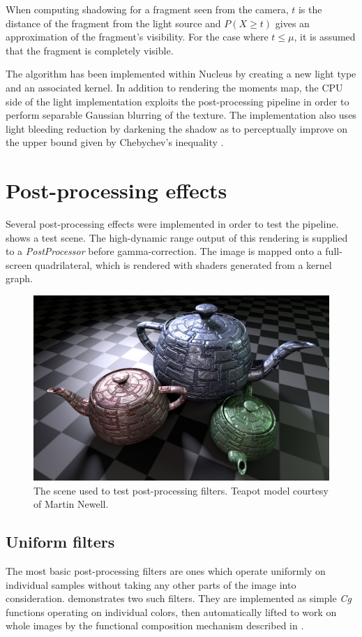 When computing shadowing for a fragment seen from the camera, $t$ is the distance of the fragment from the light source and $P(X \geq t)$ gives an approximation of the fragment's visibility. For the case where $t \leq \mu$, it is assumed that the fragment is completely visible.

The algorithm has been implemented within Nucleus by creating a new light type and an associated kernel. In addition to rendering the moments map, the CPU side of the light implementation exploits the post-processing pipeline in order to perform separable Gaussian blurring of the texture. The implementation also uses light bleeding reduction by darkening the shadow as to perceptually improve on the upper bound given by Chebychev's inequality \cite{SATVSM}.

\clearpage
\section{Post-processing effects}

Several post-processing effects were implemented in order to test the pipeline.  shows a test scene. The high-dynamic range output of this rendering is supplied to a \emph{PostProcessor} before gamma-correction. The image is mapped onto a full-screen quadrilateral, which is rendered with shaders generated from a kernel graph.

\begin{figure}[ht!]
  \centering
  \includegraphics[width=0.45\linewidth]{./Figures/postProc/off.jpg}
  \caption[Post-processing test scene]{The scene used to test post-processing filters. Teapot model courtesy of Martin Newell.}
  \label{fig:postProcOff}
\end{figure}

\subsection{Uniform filters}

The most basic post-processing filters are ones which operate uniformly on individual samples without taking any other parts of the image into consideration.  demonstrates two such filters. They are implemented as simple \emph{Cg} functions operating on individual colors, then automatically lifted to work on whole images by the functional composition mechanism described in .

